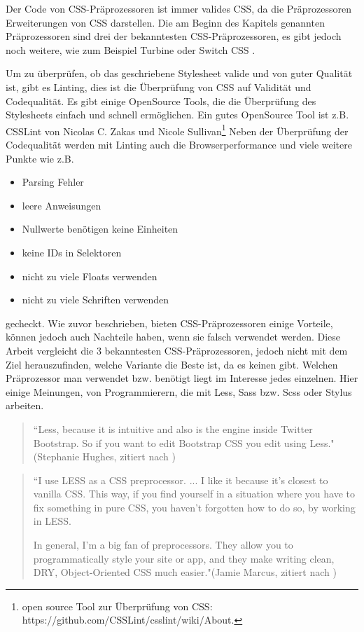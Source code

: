 Der Code von CSS-Präprozessoren ist immer valides CSS, da die Präprozessoren Erweiterungen von CSS darstellen. Die am Beginn des Kapitels genannten Präprozessoren sind drei der bekanntesten CSS-Präprozessoren, es gibt jedoch noch weitere, wie zum Beispiel Turbine oder Switch CSS \autocite[]{Jung.2010}.

Um zu überprüfen, ob das geschriebene Stylesheet valide und von guter Qualität ist, gibt es Linting, dies ist die Überprüfung von CSS auf Validität und Codequalität. Es gibt einige OpenSource Tools, die die Überprüfung des Stylesheets einfach und schnell ermöglichen. Ein gutes OpenSource Tool ist z.B. CSSLint von Nicolas C. Zakas und Nicole Sullivan\footnote[1]{open source Tool zur Überprüfung von CSS: https://github.com/CSSLint/csslint/wiki/About.}\newline
Neben der Überprüfung der Codequalität werden mit Linting auch die Browserperformance und viele weitere Punkte wie z.B.
\begin{itemize}
  \item Parsing Fehler
  \item leere Anweisungen
  \item Nullwerte benötigen keine Einheiten
  \item keine IDs in Selektoren
  \item nicht zu viele Floats verwenden
  \item nicht zu viele Schriften verwenden
\end{itemize} 
gecheckt. \newline\newline
Wie zuvor beschrieben, bieten CSS-Präprozessoren einige Vorteile, können jedoch auch Nachteile haben,  wenn sie falsch verwendet werden. Diese Arbeit vergleicht die 3 bekanntesten CSS-Präprozessoren, jedoch nicht mit dem Ziel herauszufinden, welche Variante die Beste ist, da es keinen \glqq{} gibt.\newline
Welchen Präprozessor man verwendet bzw. benötigt liegt im Interesse jedes einzelnen. Hier einige Meinungen, von Programmierern, die mit Less, Sass bzw. Scss oder Stylus arbeiten. 
\begin{quote}
``Less, because it is intuitive and also is the engine inside Twitter Bootstrap. So if you want to edit Bootstrap CSS you edit using Less."(Stephanie Hughes, zitiert nach \cite[]{psdtowp.2014})
\end{quote} 
\begin{quote}
``I use LESS as a CSS preprocessor. ... I like it because it's closest to vanilla CSS. This way, if you find yourself in a situation where you have to fix something in pure CSS, you haven't forgotten how to do so, by working in LESS.

In general, I'm a big fan of preprocessors. They allow you to programmatically style your site or app, and they make writing clean, DRY, Object-Oriented CSS much easier."(Jamie Marcus, zitiert nach \cite[]{psdtowp.2014})
\end{quote} 
